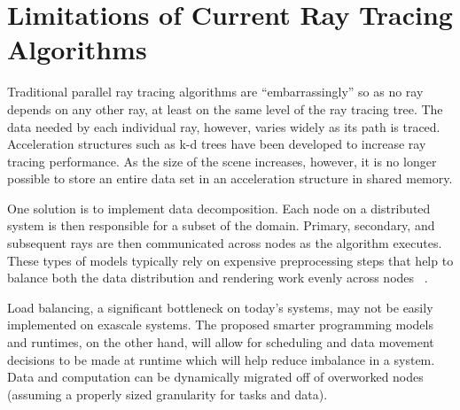 \section{Limitations of Current Ray Tracing Algorithms}
\label{sec:limitations}

Traditional parallel ray tracing algorithms are ``embarrassingly'' so
as no ray depends on any other ray, at least on the same level of the
ray tracing tree. The data needed by each individual ray, however,
varies widely as its path is traced. Acceleration structures such as
k-d trees
have been developed to increase ray tracing performance. As the size
of the scene increases, however, it is no longer possible to store an
entire data set in an acceleration structure in shared memory.

One solution is to implement data decomposition. Each node on a
distributed system is then responsible for a subset of the domain.
Primary, secondary, and subsequent rays are then communicated across
nodes as the algorithm executes. These types of models typically rely
on expensive preprocessing steps that help to balance both the data
distribution and rendering work evenly across nodes
~\cite{navratil2014dynamic}.

Load balancing, a significant bottleneck on today’s systems, may not
be easily implemented on exascale systems. The proposed smarter
programming models and runtimes, on the other hand, will allow for
scheduling and data movement decisions to be made at runtime which
will help reduce imbalance in a system. Data and computation can be
dynamically migrated off of overworked nodes (assuming a properly
sized granularity for tasks and data).

